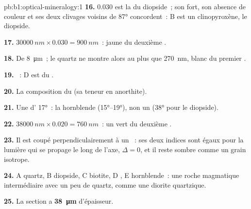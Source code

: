 \begin{solution}{pb:b1:optical-mineralogy:1}
\textbf{16.} $0.030$ est la  du diopside~; son  fort, son
absence de couleur et ses deux clivages voisins de \ang{87} concordent~: B est un
clinopyroxène, le diopside.

\textbf{17.} $\qty{30000}{nm}\times0.030 = \qty{900}{nm}$~: jaune du deuxième .

\textbf{18.} De \qty{8}{\micro m}~; le quartz ne montre alors au plus que
\qty{270}{nm}, blanc du premier .

\textbf{19.} ~: D est du .

\textbf{20.} La composition du  (sa teneur en anorthite).

\textbf{21.} Une  d' \ang{17}~: la hornblende
(\ang{15}--\ang{19}), non un  (\ang{38} pour le diopside).

\textbf{22.} $\qty{38000}{nm}\times0.020 = \qty{760}{nm}$~: un vert du deuxième
.

\textbf{23.} Il est coupé perpendiculairement à un ~: ses deux indices
sont égaux pour la lumière qui se propage le long de l'axe, $\Delta = 0$, et il
reste sombre comme un grain isotrope.

\textbf{24.} A quartz, B diopside, C biotite, D , E hornblende~: une
roche magmatique intermédiaire avec un peu de quartz, comme une diorite quartzique.

\textbf{25.} La section a \textbf{\qty[text-series-to-math=true]{38}{\micro m}} d'épaisseur.
\end{solution}
